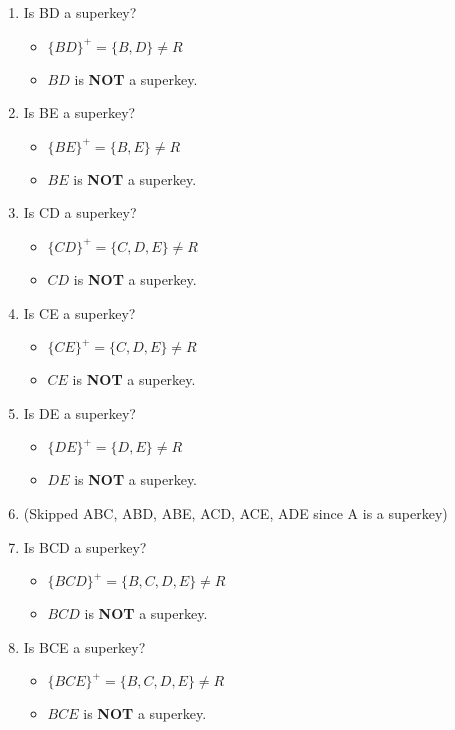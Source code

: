 \documentclass{article}[a4paper,11pt]
\begin{document}
\begin{enumerate}
\begin{itemize}
    \end{itemize}
    \item Is BD a superkey?
    \begin{itemize}
        \item $\{BD\}^+ = \{B,D\} \neq R$
        \item $BD$ is \textbf{NOT} a superkey.
    \end{itemize}
    \item Is BE a superkey?
    \begin{itemize}
        \item $\{BE\}^+ = \{B,E\} \neq R$
        \item $BE$ is \textbf{NOT} a superkey.
    \end{itemize}
    \item Is CD a superkey?
    \begin{itemize}
        \item $\{CD\}^+ = \{C,D,E\} \neq R$
        \item $CD$ is \textbf{NOT} a superkey.
    \end{itemize}
    \item Is CE a superkey?
    \begin{itemize}
        \item $\{CE\}^+ = \{C,D,E\} \neq R$
        \item $CE$ is \textbf{NOT} a superkey.
    \end{itemize}
    \item Is DE a superkey?
    \begin{itemize}
        \item $\{DE\}^+ = \{D,E\} \neq R$
        \item $DE$ is \textbf{NOT} a superkey.
    \end{itemize}
    \item (Skipped ABC, ABD, ABE, ACD, ACE, ADE since A is a superkey)
    \item Is BCD a superkey?
    \begin{itemize}
        \item $\{BCD\}^+ = \{B,C,D,E\} \neq R$
        \item $BCD$ is \textbf{NOT} a superkey.
    \end{itemize}
    \item Is BCE a superkey?
    \begin{itemize}
        \item $\{BCE\}^+ = \{B,C,D,E\} \neq R$
        \item $BCE$ is \textbf{NOT} a superkey.

\end{itemize}
\end{enumerate}
\end{document}
